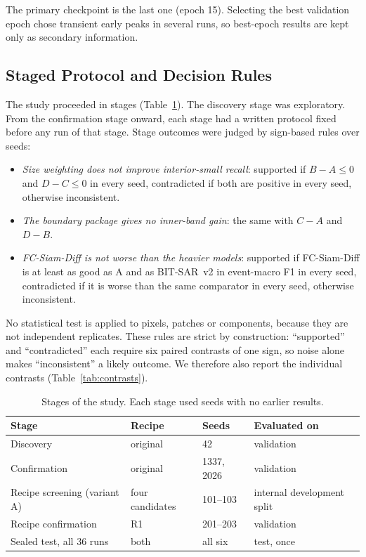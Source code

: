 \documentclass[runningheads]{llncs}
\begin{document}
The primary checkpoint is the last one (epoch 15). Selecting the best validation epoch chose
transient early peaks in several runs, so best-epoch results are kept only as secondary
information.

\subsection{Staged Protocol and Decision Rules}
\label{sec:protocol}

The study proceeded in stages (Table~\ref{tab:stages}). The discovery stage was exploratory.
From the confirmation stage onward, each stage had a written protocol fixed before any run
of that stage. Stage outcomes were judged by sign-based rules over seeds:
\begin{itemize}
\item \emph{Size weighting does not improve interior-small recall}: supported if
$B-A\le 0$ and $D-C\le 0$ in every seed, contradicted if both are positive in every seed,
otherwise inconsistent.
\item \emph{The boundary package gives no inner-band gain}: the same with $C-A$ and $D-B$.
\item \emph{FC-Siam-Diff is not worse than the heavier models}: supported if FC-Siam-Diff is
at least as good as A and as BIT-SAR~v2 in event-macro F1 in every seed, contradicted if it
is worse than the same comparator in every seed, otherwise inconsistent.
\end{itemize}
No statistical test is applied to pixels, patches or components, because they are not
independent replicates. These rules are strict by construction: ``supported'' and
``contradicted'' each require six paired contrasts of one sign, so noise alone makes
``inconsistent'' a likely outcome. We therefore also report the individual contrasts
(Table~\ref{tab:contrasts}).

\begin{table}[t]
\centering
\caption{Stages of the study. Each stage used seeds with no earlier results.}
\label{tab:stages}
\begin{tabular}{llll}
\toprule
Stage & Recipe & Seeds & Evaluated on \\
\midrule
Discovery & original & 42 & validation \\
Confirmation & original & 1337, 2026 & validation \\
Recipe screening (variant A) & four candidates & 101--103 & internal development split \\
Recipe confirmation & R1 & 201--203 & validation \\
Sealed test, all 36 runs & both & all six & test, once \\
\bottomrule
\end{tabular}
\end{table}
\end{document}
